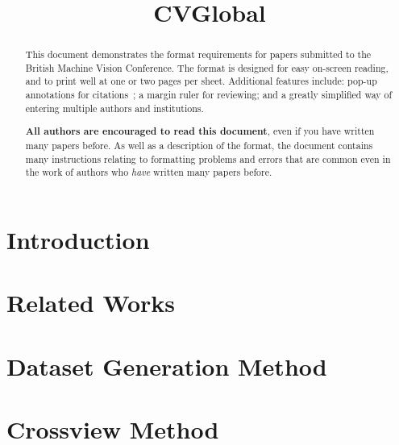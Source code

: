 \documentclass{bmvc2k}
\title{CVGlobal}
\begin{document}
\maketitle

\begin{abstract}
This document demonstrates the format requirements for papers submitted
to the British Machine Vision Conference.  The format is designed for
easy on-screen reading, and to print well at one or two pages per sheet.
Additional features include: pop-up annotations for
citations~\cite{Authors06,Mermin89}; a margin ruler for reviewing; and a
greatly simplified way of entering multiple authors and institutions.

{\bf All authors are encouraged to read this document}, even if you have
written many papers before.  As well as a description of the format, the
document contains many instructions relating to formatting problems and
errors that are common even in the work of authors who {\em have}
written many papers before.
\end{abstract}

\section{Introduction}
\label{sec:intro}


\section{Related Works}
\label{sec:related_works}


\section{Dataset Generation Method}
\label{sec:dataset_generation}


\section{Crossview Method}
\label{sec:method}



\end{document}
